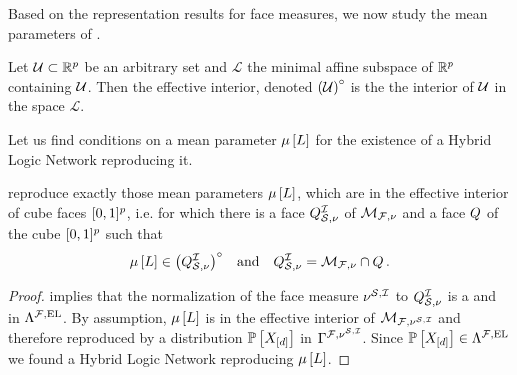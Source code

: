 \label{sec:HLNrepMean} %

Based on the representation results for face measures, we now study the mean parameters of \HybridLogicNetworks{}.

\begin{definition}
    Let $\mathcal{U}\subset\mathbb{R}^{p}$ be an arbitrary set and $\mathcal{L}$ the minimal affine subspace of $\mathbb{R}^{p}$ containing $\mathcal{U}$.
    Then the effective interior, denoted ${\left(\mathcal{U}\right)}^{\circ}$ is the the interior of $\mathcal{U}$ in the space $\mathcal{L}$.
\end{definition}


Let us find conditions on a mean parameter $\mu\left[L\right]$ for the existence of a Hybrid Logic Network reproducing it. %

\begin{theorem}
    \label{the:hlnInteriorCharacterization}
    \HybridLogicNetworks{} reproduce exactly those mean parameters $\mu\left[L\right]$, which are in the effective interior of cube faces $[0,1]^{p}$, i.e. for which there is a face $Q^{\mathcal{I}}_{\mathcal{S},\nu}$ of $\mathcal{M}_{\mathcal{F},\nu}$ and a face $Q$ of the cube $[0,1]^{p}$ such that
    \begin{align*}
        \mu\left[L\right]\in{\left(Q^{\mathcal{I}}_{\mathcal{S},\nu}\right)}^{\circ} \quad\text{and}\quad Q^{\mathcal{I}}_{\mathcal{S},\nu} = \mathcal{M}_{\mathcal{F},\nu}\cap Q \, .
    \end{align*}
\end{theorem}
\begin{proof}
     implies that the normalization of the face measure $\nu^{\mathcal{S},\mathcal{I}}$ to $Q^{\mathcal{I}}_{\mathcal{S},\nu}$ is a \HardLogicNetwork{} and in $\Lambda^{\mathcal{F},\mathrm{EL}}$.
    By assumption, $\mu\left[L\right]$ is in the effective interior of $\mathcal{M}_{\mathcal{F},\nu^{\mathcal{S},\mathcal{I}}}$ and therefore reproduced by a distribution $\mathbb{P}\left[X_{[d]}\right]$ in $\Gamma^{\mathcal{F},\nu^{\mathcal{S},\mathcal{I}}}$.
    Since $\mathbb{P}\left[X_{[d]}\right]\in\Lambda^{\mathcal{F},\mathrm{EL}}$ we found a Hybrid Logic Network reproducing $\mu\left[L\right]$.
\end{proof}

